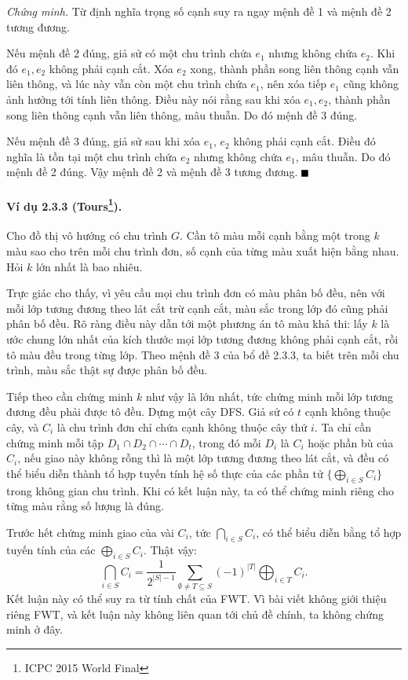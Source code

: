 \documentclass[11pt]{article}
\providecommand{\square}{\mathord{\vcenter{\hrule height .6em width .6em}}}
\begin{document}
\emph{Chứng minh.}
Từ định nghĩa trọng số cạnh suy ra ngay mệnh đề 1 và mệnh đề 2 tương đương.

Nếu mệnh đề 2 đúng, giả sử có một chu trình chứa $e_1$ nhưng không chứa $e_2$.
Khi đó $e_1,e_2$ không phải cạnh cắt. Xóa $e_2$ xong, thành phần song liên thông
cạnh vẫn liên thông, và lúc này vẫn còn một chu trình chứa $e_1$, nên xóa tiếp
$e_1$ cũng không ảnh hưởng tới tính liên thông. Điều này nói rằng sau khi xóa
$e_1,e_2$, thành phần song liên thông cạnh vẫn liên thông, mâu thuẫn. Do đó
mệnh đề 3 đúng.

Nếu mệnh đề 3 đúng, giả sử sau khi xóa $e_1$, $e_2$ không phải cạnh cắt. Điều đó
nghĩa là tồn tại một chu trình chứa $e_2$ nhưng không chứa $e_1$, mâu thuẫn. Do
đó mệnh đề 2 đúng. Vậy mệnh đề 2 và mệnh đề 3 tương đương. \hfill$\square$

\paragraph{Ví dụ 2.3.3 (Tours\protect\footnote{ICPC 2015 World Final}).}
Cho đồ thị vô hướng có chu trình $G$. Cần tô màu mỗi cạnh bằng một trong $k$ màu
sao cho trên mỗi chu trình đơn, số cạnh của từng màu xuất hiện bằng nhau. Hỏi
$k$ lớn nhất là bao nhiêu.

Trực giác cho thấy, vì yêu cầu mọi chu trình đơn có màu phân bố đều, nên với mỗi
lớp tương đương theo lát cắt trừ cạnh cắt, màu sắc trong lớp đó cũng phải phân
bố đều. Rõ ràng điều này dẫn tới một phương án tô màu khả thi: lấy $k$ là ước
chung lớn nhất của kích thước mọi lớp tương đương không phải cạnh cắt, rồi tô
màu đều trong từng lớp. Theo mệnh đề 3 của bổ đề 2.3.3, ta biết trên mỗi chu
trình, màu sắc thật sự được phân bố đều.

Tiếp theo cần chứng minh $k$ như vậy là lớn nhất, tức chứng minh mỗi lớp tương
đương đều phải được tô đều. Dựng một cây DFS. Giả sử có $t$ cạnh không thuộc
cây, và $C_i$ là chu trình đơn chỉ chứa cạnh không thuộc cây thứ $i$. Ta chỉ cần
chứng minh mỗi tập
$D_1\cap D_2\cap\cdots\cap D_t$, trong đó mỗi $D_i$ là $C_i$ hoặc phần bù của
$C_i$, nếu giao này không rỗng thì là một lớp tương đương theo lát cắt, và đều
có thể biểu diễn thành tổ hợp tuyến tính hệ số thực của các phần tử
$\{\bigoplus_{i\in S}C_i\}$ trong không gian chu trình. Khi có kết luận này, ta
có thể chứng minh riêng cho từng màu rằng số lượng là đúng.

Trước hết chứng minh giao của vài $C_i$, tức $\bigcap_{i\in S} C_i$, có thể
biểu diễn bằng tổ hợp tuyến tính của các $\bigoplus_{i\in S}C_i$. Thật vậy:
\[
\bigcap_{i\in S} C_i =
\frac{1}{2^{|S|-1}}\sum_{\emptyset\ne T\subseteq S}
(-1)^{|T|}\bigoplus_{i\in T} C_i .
\]
Kết luận này có thể suy ra từ tính chất của FWT. Vì bài viết không giới thiệu
riêng FWT, và kết luận này không liên quan tới chủ đề chính, ta không chứng minh
ở đây.
\end{document}
